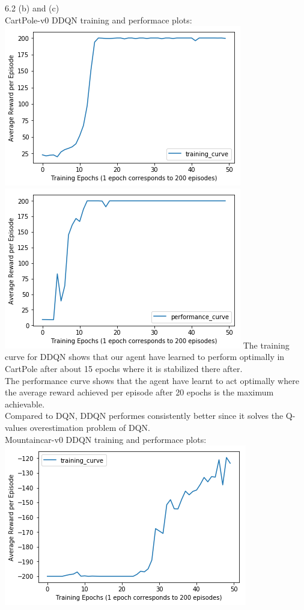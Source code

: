 \documentclass[12pt]{article}
\begin{document}
    \begin{tcolorbox}[fit,height=22cm, width=\textwidth, blank, borderline={1pt}{-2pt},nobeforeafter]
    {\large 6.2  (b) and (c)} \\
    {\large CartPole-v0 DDQN training and performace plots:} \\
    \includegraphics[width=.5\textwidth]{figures/CP_ddqn_training_curve}
    \includegraphics[width=.5\textwidth]{figures/CP_ddqn_performance_curve}
    The training curve for DDQN shows that our agent have learned to perform optimally in CartPole after about 15 epochs where it is stabilized there after. \\
    The performance curve shows that the agent have learnt to act optimally where the average reward achieved per episode after 20 epochs is the maximum achievable.\\
    Compared to DQN, DDQN performes consistently better since it solves the Q-values overestimation problem of DQN.
    \\
   	{\large Mountaincar-v0 DDQN training and performace plots:} \\
    \includegraphics[width=.5\textwidth]{figures/MC_ddqn_training_curve}

\end{tcolorbox}
\end{document}
